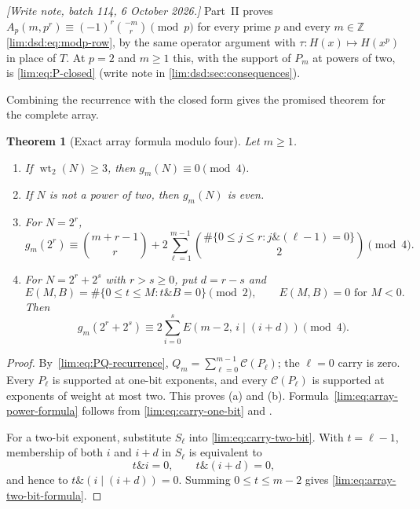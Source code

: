 \documentclass[11pt]{article}
\newtheorem{theorem}{Theorem}[section]
\theoremstyle{definition}
\theoremstyle{remark}
\newcommand{\wt}{\operatorname{wt}_2}
\newcommand{\band}{\mathbin{\&}}
\newcommand{\bor}{\mathbin{\vert}}
\begin{document}
\emph{[Write note, batch 114, 6 October 2026.]} Part~II proves
$A_p(m,p^r)\equiv(-1)^r\binom{-m}{r}\pmod p$ for every prime $p$ and every
$m\in\mathbb Z$ \eqref{lim:dsd:eq:modp-row}, by the same operator argument
with $\tau\colon H(x)\mapsto H(x^p)$ in place of $T$. At $p=2$ and $m\ge1$
this, with the support of $P_m$ at powers of two, is \eqref{lim:eq:P-closed}
(write note in \cref{lim:dsd:sec:consequences}).

Combining the recurrence with the closed form gives the promised theorem for
the complete array.

\begin{theorem}[Exact array formula modulo four]
\label{lim:thm:full-array-formula}
Let $m\ge1$.
\begin{enumerate}[label=\textup{(\alph*)}]
\item If $\wt(N)\ge3$, then $g_m(N)\equiv0\pmod4$.
\item If $N$ is not a power of two, then $g_m(N)$ is even.
\item For $N=2^r$,
\begin{equation}\label{lim:eq:array-power-formula}
 g_m(2^r)\equiv
 \binom{m+r-1}{r}
 +2\sum_{\ell=1}^{m-1}
     \binom{\#\{0\le j\le r:j\band(\ell-1)=0\}}2
 \pmod4.
\end{equation}
\item For $N=2^r+2^s$ with $r>s\ge0$, put $d=r-s$ and
\begin{equation}\label{lim:eq:E-def}
 E(M,B)=\#\{0\le t\le M:t\band B=0\}\pmod2,
 \qquad E(M,B)=0\text{ for }M<0.
\end{equation}
Then
\begin{equation}\label{lim:eq:array-two-bit-formula}
  g_m(2^r+2^s)
  \equiv
  2\sum_{i=0}^{s}E(m-2,\,i\bor(i+d))
  \pmod4.
\end{equation}
\end{enumerate}
\end{theorem}

\begin{proof}
By~\eqref{lim:eq:PQ-recurrence},
$Q_m=\sum_{\ell=0}^{m-1}\mathcal C(P_\ell)$; the $\ell=0$ carry is zero.
Every $P_\ell$ is supported at one-bit exponents, and every
$\mathcal C(P_\ell)$ is supported at exponents of weight at most two.
This proves (a) and (b).  Formula~\eqref{lim:eq:array-power-formula} follows from
\eqref{lim:eq:carry-one-bit} and .

For a two-bit exponent, substitute $S_\ell$ into
\eqref{lim:eq:carry-two-bit}.  With $t=\ell-1$, membership of both $i$ and $i+d$
in $S_\ell$ is equivalent to
\[
 t\band i=0,
 \qquad t\band(i+d)=0,
\]
and hence to $t\band(i\bor(i+d))=0$.  Summing $0\le t\le m-2$ gives
\eqref{lim:eq:array-two-bit-formula}.
\end{proof}
\end{document}
